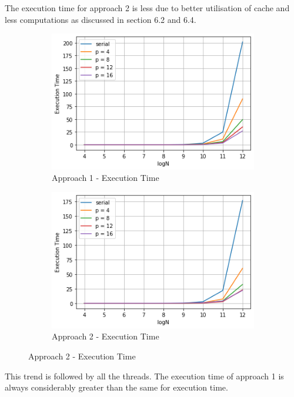 \documentclass{article}
\begin{document}
The execution time for approach 2 is less due to better utilisation of cache and less computations as discussed in section 6.2 and 6.4.
\begin{figure}[!h]
     \begin{subfigure}[b]{0.45\textwidth}
         \centering
         \includegraphics[width=\textwidth]{app1_exec.png}
         \caption{Approach 1 - Execution Time}
     \end{subfigure}
     \hfill
     \begin{subfigure}[b]{0.45\textwidth}
         \includegraphics[width=\textwidth]{app2_exec.png}
         \caption{Approach 2 - Execution Time}
     \end{subfigure}
\end{figure}

This trend is followed by all the threads. The execution time of approach 1 is always considerably greater than the same for execution time.
\end{document}
